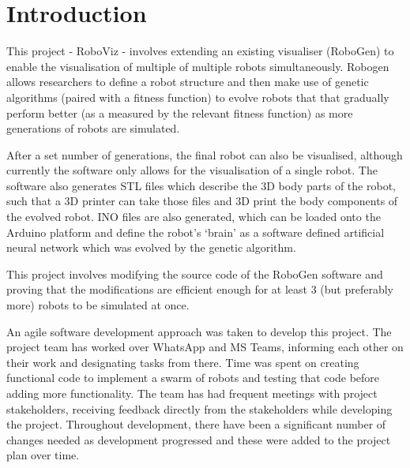 \documentclass[11pt,a4paper]{article}
\begin{document}
\tableofcontents
\section{Introduction}
\label{s:introduction}
%
%

This project - RoboViz - involves extending an existing visualiser (RoboGen) to
enable the visualisation of multiple of multiple robots simultaneously.
Robogen allows researchers to define a robot structure and then make use of
genetic algorithms (paired with a fitness function) to evolve robots that that
gradually perform better (as a measured by the relevant fitness function) as
more generations of robots are simulated.


After a set number of generations, the final robot can also be visualised,
although currently the software only allows for the visualisation of a single
robot. The software also generates STL files which describe the 3D body parts
of the robot, such that a 3D printer can take those files and 3D print the body
components of the evolved robot. INO files are also generated, which can be
loaded onto the Arduino platform and define the robot’s ‘brain’ as a software
defined artificial neural network which was evolved by the genetic algorithm.


This project involves modifying the source code of the RoboGen software and
proving that the modifications are efficient enough for at least 3 (but
preferably more) robots to be simulated at once.


An agile software development approach was taken to develop this project. The
project team has worked over WhatsApp and MS Teams, informing each other on
their work and designating tasks from there. Time was spent on creating
functional code to implement a swarm of robots and testing that code before
adding more functionality. The team has had frequent meetings with project
stakeholders, receiving feedback directly from the stakeholders while
developing the project. Throughout development, there have been a significant
number of changes needed as development progressed and these were added to the
project plan over time.
\end{document}
